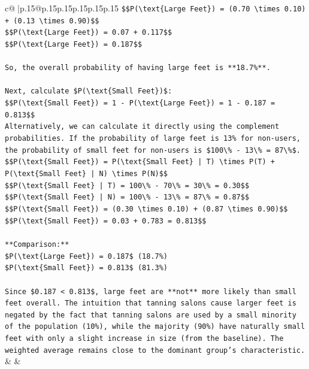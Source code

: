 \documentclass{article}
\begin{document}
{\begin{supertabular}{c@{$\;$}|p{.15\linewidth}@{}p{.15\linewidth}p{.15\linewidth}p{.15\linewidth}p{.15\linewidth}p{.15\linewidth}}
{{{\texttt{\$\$P(\textbackslash{}text\{Large Feet\}) = (0.70 \textbackslash{}times 0.10) + (0.13 \textbackslash{}times 0.90)\$\$} \\
\texttt{\$\$P(\textbackslash{}text\{Large Feet\}) = 0.07 + 0.117\$\$} \\
\texttt{\$\$P(\textbackslash{}text\{Large Feet\}) = 0.187\$\$} \\
\\ 
\texttt{So, the overall probability of having large feet is **18.7\%**.} \\
\\ 
\texttt{Next, calculate \$P(\textbackslash{}text\{Small Feet\})\$:} \\
\texttt{\$\$P(\textbackslash{}text\{Small Feet\}) = 1 {-} P(\textbackslash{}text\{Large Feet\}) = 1 {-} 0.187 = 0.813\$\$} \\
\texttt{Alternatively, we can calculate it directly using the complement probabilities. If the probability of large feet is 13\% for non{-}users, the probability of small feet for non{-}users is \$100\textbackslash{}\% {-} 13\textbackslash{}\% = 87\textbackslash{}\%\$.} \\
\texttt{\$\$P(\textbackslash{}text\{Small Feet\}) = P(\textbackslash{}text\{Small Feet\} | T) \textbackslash{}times P(T) + P(\textbackslash{}text\{Small Feet\} | N) \textbackslash{}times P(N)\$\$} \\
\texttt{\$\$P(\textbackslash{}text\{Small Feet\} | T) = 100\textbackslash{}\% {-} 70\textbackslash{}\% = 30\textbackslash{}\% = 0.30\$\$} \\
\texttt{\$\$P(\textbackslash{}text\{Small Feet\} | N) = 100\textbackslash{}\% {-} 13\textbackslash{}\% = 87\textbackslash{}\% = 0.87\$\$} \\
\texttt{\$\$P(\textbackslash{}text\{Small Feet\}) = (0.30 \textbackslash{}times 0.10) + (0.87 \textbackslash{}times 0.90)\$\$} \\
\texttt{\$\$P(\textbackslash{}text\{Small Feet\}) = 0.03 + 0.783 = 0.813\$\$} \\
\\ 
\texttt{**Comparison:**} \\
\texttt{\$P(\textbackslash{}text\{Large Feet\}) = 0.187\$ (18.7\%)} \\
\texttt{\$P(\textbackslash{}text\{Small Feet\}) = 0.813\$ (81.3\%)} \\
\\ 
\texttt{Since \$0.187 < 0.813\$, large feet are **not** more likely than small feet overall. The intuition that tanning salons cause larger feet is negated by the fact that tanning salons are used by a small minority of the population (10\%), while the majority (90\%) have naturally small feet with only a slight increase in size (from the baseline). The weighted average remains close to the dominant group's characteristic.} \\
            }
        }
    }
    & & \\ \\


\end{supertabular}}
\end{document}
